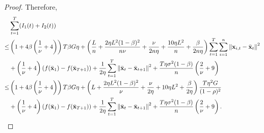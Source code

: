 \documentclass{article}
\begin{document}
\begin{proof}
Therefore, 
\begin{align}
\nonumber
&\sum_{t=1}^T (I_1(t) + I_2(t)) \\ \nonumber
\le & \left( 1 + 4\beta\left( \frac{1}{\nu}+4 \right) \right)T\beta G \eta + \left(  \frac{L}{n} + \frac{2\eta L^2(1-\beta)^2}{n\nu} + \frac{\nu}{2n\eta} + \frac{10\eta L^2}{n}  + \frac{\beta}{2n\eta}  \right)\sum_{t=1}^T\sum_{i=1}^n\left\lVert{\bf x}_{i,t} - \bar{{\bf x}}_t \right\rVert^2 \\ \nonumber 
&+ \left( \frac{1}{\nu} + 4 \right)\left( f(\bar{{\bf x}}_1) - f(\bar{{\bf x}}_{T+1}) \right) + \frac{1}{2\eta}\sum_{t=1}^T\left\lVert \bar{{\bf x}}_t - \bar{{\bf x}}_{t+1}\right\rVert^2 + \frac{T\eta \sigma^2 (1-\beta)}{n}\left( \frac{2}{\nu}+9 \right) \\ \nonumber
\le & \left( 1 + 4\beta\left( \frac{1}{\nu}+4 \right) \right)T\beta G \eta + \left(  L + \frac{2\eta L^2(1-\beta)^2}{\nu} + \frac{\nu}{2\eta} + 10\eta L^2  + \frac{\beta}{2\eta}  \right) \frac{T \eta^2 G}{(1-\rho)^2} \\ \nonumber 
&+ \left( \frac{1}{\nu} + 4 \right)\left( f(\bar{{\bf x}}_1) - f(\bar{{\bf x}}_{T+1}) \right) + \frac{1}{2\eta}\sum_{t=1}^T\left\lVert \bar{{\bf x}}_t - \bar{{\bf x}}_{t+1}\right\rVert^2 + \frac{T\eta \sigma^2 (1-\beta)}{n}\left( \frac{2}{\nu}+9 \right).
\end{align}







\end{proof}
\end{document}
